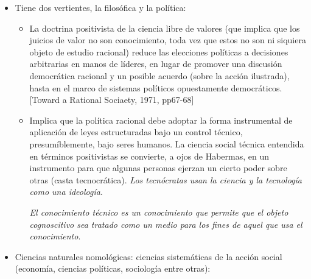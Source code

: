 \documentclass[
  letterpaper,
  DIV=11,
  numbers=noendperiod]{scrreprt}
\begin{document}
\begin{itemize}
\begin{itemize}
    \begin{itemize}
    \item
      Conocimiento constitutivo: Todos los seres humanos lo adquieren a
      través de los progresos en socialización, los cuales proporcionan
      una imagen estructurada lingüísticamente de su mundo social y les
      capacita para participar en él.
    \item
      Conocimiento científico: Esfuerzo por aprender o comprender el
      mundo mental compartido que estructura las interacciones de los
      seres humanos sociales. Las ciencias hermenéuticas no están en
      situación de contestar a un tercero de los intereses humanos:

      \begin{itemize}
      \item
        Hermenéuticas
      \item
        Histórico-hermenéuticas y
      \item
        Ciencias culturales
      \end{itemize}
    \end{itemize}
  \item
    Tiene dos vertientes, la filosófica y la política:

    \begin{itemize}
    \item
      La doctrina positivista de la ciencia libre de valores (que
      implica que los juicios de valor no son conocimiento, toda vez que
      estos no son ni siquiera objeto de estudio racional) reduce las
      elecciones políticas a decisiones arbitrarias en manos de líderes,
      en lugar de promover una discusión democrática racional y un
      posible acuerdo (sobre la acción ilustrada), hasta en el marco de
      sistemas políticos opuestamente democráticos. {[}Toward a Rational
      Sociaety, 1971, pp67-68{]}
    \item
      Implica que la política racional debe adoptar la forma
      instrumental de aplicación de leyes estructuradas bajo un control
      técnico, presumíblemente, bajo seres humanos. La ciencia social
      técnica entendida en términos positivistas se convierte, a ojos de
      Habermas, en un instrumento para que algunas personas ejerzan un
      cierto poder sobre otras (casta tecnocrática). \emph{Los
      tecnócratas usan la ciencia y la tecnología como una ideología}.

      \emph{El conocimiento técnico es un conocimiento que permite que
      el objeto cognoscitivo sea tratado como un medio para los fines de
      aquel que usa el conocimiento}.
    \end{itemize}
  \item
    Ciencias naturales nomológicas: ciencias sistemáticas de la acción
    social (economía, ciencias políticas, sociología entre otras):


\end{itemize}
\end{itemize}
\end{document}
